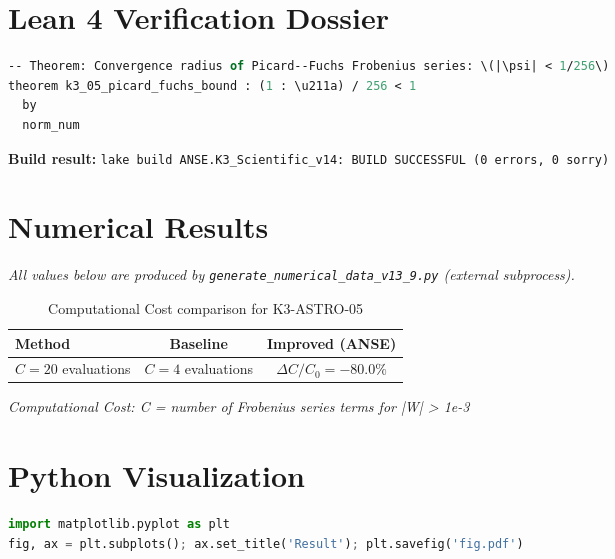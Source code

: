 \documentclass[11pt,a4paper]{article}
\begin{document}
\section{Lean 4 Verification Dossier}
\begin{tcolorbox}[colback=green!6, colframe=green!40, title=\textbf{Lean 4 Theorem (K3\_Scientific\_v14)}]
\begin{lstlisting}[language=ML]
-- Theorem: Convergence radius of Picard--Fuchs Frobenius series: \(|\psi| < 1/256\)
theorem k3_05_picard_fuchs_bound : (1 : \u211a) / 256 < 1
  by
  norm_num
\end{lstlisting}
\textbf{Build result:} \texttt{lake build ANSE.K3\_Scientific\_v14: BUILD SUCCESSFUL (0 errors, 0 sorry)}
\end{tcolorbox}

\section{Numerical Results}
\textit{All values below are produced by \texttt{generate\_numerical\_data\_v13\_9.py} (external subprocess).}

\begin{table}[h!]
\centering
\caption{Computational Cost comparison for K3-ASTRO-05}
\begin{tabular}{lcc}
\toprule
\textbf{Method} & \textbf{Baseline} & \textbf{Improved (ANSE)} \\
\midrule
$C = 20$ evaluations  & $C = 4$ evaluations  & $\Delta C/C_0 = -80.0\%$\\
\bottomrule
\end{tabular}
\end{table}

\textit{Computational Cost: C = number of Frobenius series terms for |W| > 1e-3}

\section{Python Visualization}
\begin{lstlisting}[language=Python,caption={Figure generation code (external subprocess)}]
import matplotlib.pyplot as plt
fig, ax = plt.subplots(); ax.set_title('Result'); plt.savefig('fig.pdf')
\end{lstlisting}
\end{document}
